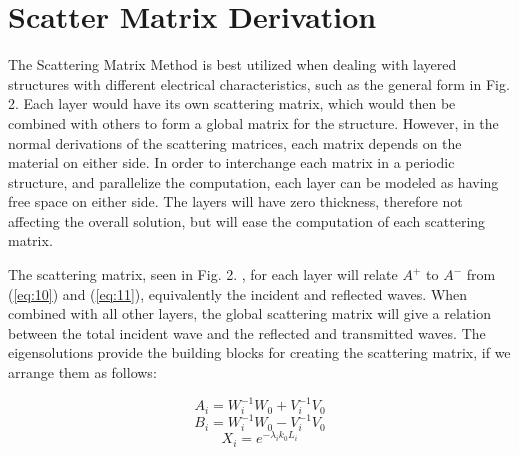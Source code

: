 \section{Scatter Matrix Derivation}\label{sec:scatter}


 The Scattering Matrix Method is best utilized when dealing with layered 
 structures with different electrical characteristics, such as the general form 
 in Fig. 2.%
 Each layer would have its own scattering matrix, 
 which would then be combined with others to form a global matrix for the 
 structure.  However, in the normal derivations of the scattering matrices, each 
 matrix depends on the material on either side.  In order to interchange each 
 matrix in a periodic structure, and parallelize the computation, each layer can 
 be modeled as having free space on either side.  The layers will have zero 
 thickness, therefore not affecting the overall solution, but will ease the 
 computation of each scattering matrix.   


 The scattering matrix, seen in Fig. 2. %
 , for each layer 
 will relate $A^+$ to $A^-$ from (\ref{eq:10}) and (\ref{eq:11}), equivalently 
 the incident and reflected waves.  When combined with all other layers, the 
 global scattering matrix will give a relation between the total incident wave 
 and the reflected and transmitted waves.  The eigensolutions provide the 
 building blocks for creating the scattering matrix, if we arrange them as 
 follows: 

\begin{equation}
  A_i = W_i^{-1}W_0 + V_i^{-1}V_0
  \label{eq:12}
  \end{equation}
\begin{equation}
  B_i = W_i^{-1}W_0 - V_i^{-1}V_0
  \label{eq:13}
  \end{equation}
\begin{equation}
  X_i = e^{-\lambda_i k_0 L_i}
  \label{eq:14}
  \end{equation}

